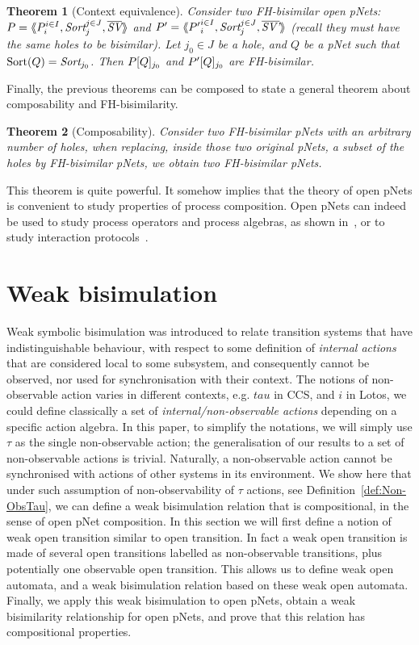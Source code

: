 \documentclass{lmcs}
\newtheorem{theorem}{Theorem}
\begin{document}
 
\begin{theorem}[Context equivalence]\label{thm-ctxt-eq}
	Consider two FH-bisimilar open pNets:
	$\pNet = \mylangle \pNet_i^{i\in I}, \Sort_j^{j\in J}, 
	\set{\symb{SV}}\myrangle$ and 	$\pNet' = \mylangle {\pNet'}_i^{i\in I}, 
	\Sort_j^{j\in 
	J}, 	\set{\symb{SV'}}\myrangle$ 
	(recall they must have the same holes to be bisimilar).
	Let $j_0\in J$ be a hole, and $Q$ be a pNet such that $\Sortop(Q)=\Sort_{j_0}$. Then 
	$P[Q]_{j_0}$ and 
	$P'[Q]_{j_0}$ are FH-bisimilar.
\end{theorem}

Finally, the previous theorems can be composed to state a general theorem about 
composability and FH-bisimilarity.
\begin{theorem}[Composability] \label{thm-composability}
	Consider two FH-bisimilar pNets with an arbitrary number of holes, when replacing, 
	inside those two original pNets, a subset of the holes by FH-bisimilar pNets, we 
	obtain two FH-bisimilar pNets.
\end{theorem}
This theorem is quite powerful. It somehow implies that the theory of open pNets is convenient to study properties of process composition. Open pNets can indeed be used to study process operators and process algebras, as shown in~\cite{henrio:Forte2016}, or to study interaction protocols~\cite{BHHM:FACS11}.

\section{Weak bisimulation}\label{sec:weak}

Weak symbolic bisimulation was introduced to relate transition systems
that have indistinguishable behaviour, with respect to some definition
of \emph{internal actions} that are considered local to some
subsystem, and consequently cannot be observed, nor used for
synchronisation with their context.
The notions of non-observable action varies in different contexts,
e.g. $tau$ in CCS, and $i$ in Lotos, we could define classically a set of
\emph{internal/non-observable actions} depending on a specific action
algebra. In this paper, to simplify the notations, we will simply use $\tau$ as the single non-observable action; the generalisation of our results to a set of non-observable actions is trivial. 
Naturally, a non-observable action cannot be synchronised with
actions of other systems in its environment. 
We show here that under such assumption of non-observability of $\tau$ actions, see Definition~\ref{def:Non-ObsTau}, we can define a weak bisimulation relation that is compositional, in the sense of open pNet composition. In this section we will first define a notion of weak open transition similar to open transition. In fact a weak open transition is made of several open transitions labelled as non-observable transitions, plus potentially one observable open transition. This allows us to define weak open automata, and a weak bisimulation relation based on these weak open automata. Finally, we apply this weak bisimulation to open pNets, obtain a weak bisimilarity relationship for open pNets, and prove that this relation has compositional properties.
\end{document}
